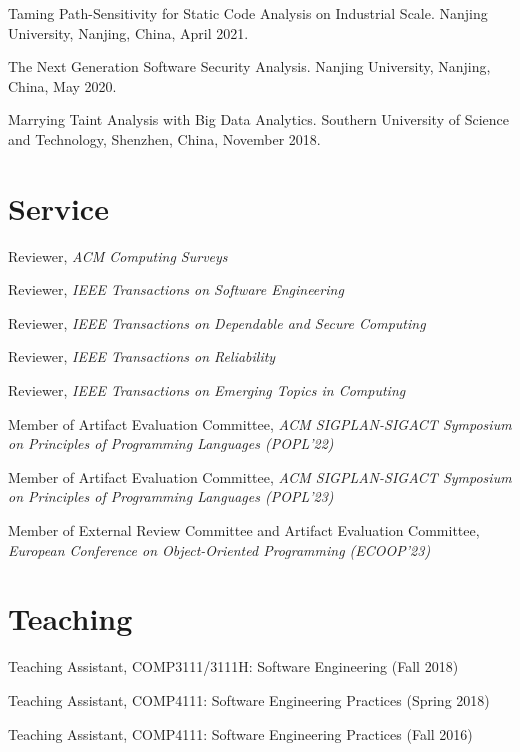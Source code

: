 \documentclass[a4paper,11pt]{article}
\begin{document}
Taming Path-Sensitivity for Static Code Analysis on Industrial Scale. Nanjing University, Nanjing, China, April 2021.
\vspace{0.2cm}

The Next Generation Software Security Analysis. Nanjing University, Nanjing, China, May 2020.
\vspace{0.2cm}

Marrying Taint Analysis with Big Data Analytics. Southern University of Science and Technology, Shenzhen, China, November 2018.

\section{Service}
Reviewer, \textit{ACM Computing Surveys}
\vspace{0.2cm}

Reviewer, \textit{IEEE Transactions on Software Engineering}
\vspace{0.2cm}

Reviewer, \textit{IEEE Transactions on Dependable and Secure Computing}
\vspace{0.2cm}

Reviewer, \textit{IEEE Transactions on Reliability}
\vspace{0.2cm}

Reviewer, \textit{IEEE Transactions on Emerging Topics in Computing}
\vspace{0.2cm}

Member of Artifact Evaluation Committee, \textit{ACM SIGPLAN-SIGACT Symposium on Principles of Programming Languages (POPL'22)}
\vspace{0.2cm}

Member of Artifact Evaluation Committee, \textit{ACM SIGPLAN-SIGACT Symposium on Principles of Programming Languages (POPL'23)}
\vspace{0.2cm}

Member of External Review Committee and Artifact Evaluation Committee, \textit{European Conference on Object-Oriented Programming (ECOOP'23)}

\section{Teaching}
Teaching Assistant, COMP3111/3111H: Software Engineering (Fall 2018)
\vspace{0.2cm}

Teaching Assistant, COMP4111: Software Engineering Practices (Spring 2018)
\vspace{0.2cm}

Teaching Assistant, COMP4111: Software Engineering Practices (Fall 2016)
\end{document}

